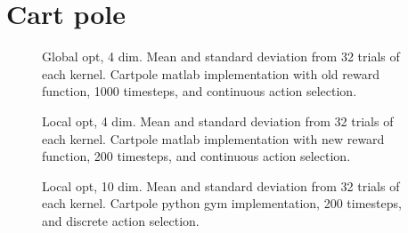 \section{Cart pole}


\begin{figure}
    \begin{center}
        \caption{Global opt, 4 dim. Mean and standard deviation from 32 trials of each kernel. Cartpole matlab implementation with old reward function, 1000 timesteps, and continuous action selection.}
    \end{center}
\end{figure}

\begin{figure}
    \begin{center}
        \caption{Local opt, 4 dim. Mean and standard deviation from 32 trials of each kernel. Cartpole matlab implementation with new reward function, 200 timesteps, and continuous action selection.}
    \end{center}
\end{figure}

\begin{figure}
    \begin{center}
        \caption{Local opt, 10 dim. Mean and standard deviation from 32 trials of each kernel. Cartpole python gym implementation, 200 timesteps, and discrete action selection.}
    \end{center}
\end{figure}
